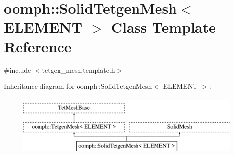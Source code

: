 \hypertarget{classoomph_1_1SolidTetgenMesh}{}\section{oomph\+:\+:Solid\+Tetgen\+Mesh$<$ E\+L\+E\+M\+E\+NT $>$ Class Template Reference}
\label{classoomph_1_1SolidTetgenMesh}


{\ttfamily \#include $<$tetgen\+\_\+mesh.\+template.\+h$>$}

Inheritance diagram for oomph\+:\+:Solid\+Tetgen\+Mesh$<$ E\+L\+E\+M\+E\+NT $>$\+:\begin{figure}[H]
\begin{center}
\leavevmode
\includegraphics[height=3.000000cm]{classoomph_1_1SolidTetgenMesh}
\end{center}
\end{figure}
